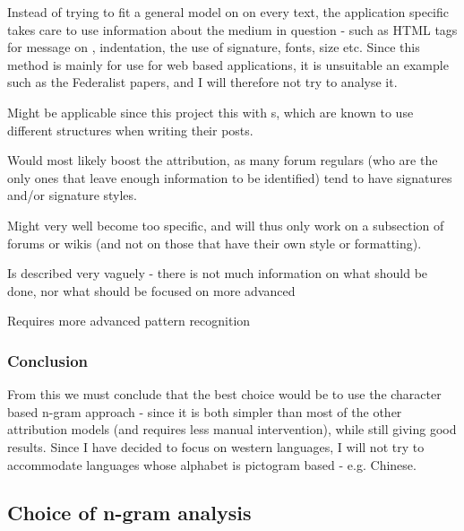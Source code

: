 {\label{application}
Instead of trying to fit a general model on on every text, the application specific takes care to use information about the medium in question - such as HTML tags for message on \forum , indentation, the use of signature, fonts, size etc.
}
{
Since this method is mainly for use for web based applications, it is unsuitable an example such as the Federalist papers, and I will therefore not try to analyse it. 
}
{
\item Might be applicable since this project this with \forum s, which are known to use different structures when writing their posts.
\item Would most likely boost the attribution, as many forum regulars (who are the only ones that leave enough information to be identified) tend to have signatures and/or signature styles.
}{
\item Might very well become too specific, and will thus only work on a subsection of forums or wikis (and not on those that have their own style or formatting).
\item Is described very vaguely - there is not much information on what should be done, nor what should be focused on more advanced
\item Requires more advanced pattern recognition 
}

\subsubsection{Conclusion}
\label{technique:conclusion}
From this we must conclude that the best choice would be to use the character based n-gram approach - since it is both simpler than most of the other attribution models (and requires less manual intervention), while still giving good results. Since I have decided to focus on western languages, I will not try to accommodate languages whose alphabet is pictogram based - e.g. Chinese.


\subsection{Choice of n-gram analysis}


